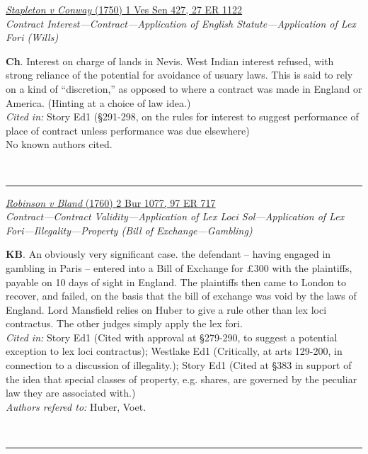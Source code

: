 \documentclass[twoside]{article}
\begin{document}
        \begin{small}
        \begin{center}
        \href{https://heinonline.org/HOL/P?h=hein.engrep/engrc0027&i=1130}{\textit{Stapleton v Conway} (1750) 1 Ves Sen 427, 27 ER 1122} \label{25} \\ 
\textit{Contract Interest---Contract---Application of English Statute---Application of Lex Fori (Wills)}\\
        \end{center}
        \textbf{Ch}. Interest on charge of lands in Nevis. West Indian interest refused, with strong reliance of the potential for avoidance of usuary laws.  This is said to rely on a kind of “discretion,” as opposed to where a contract was made in England or America. (Hinting at a choice of law idea.)\\\textit{Cited in: }Story Ed1 (§291-298, on the rules for interest to suggest performance of place of contract unless performance was due elsewhere)\\No known authors cited.
        \end{small}\\
        \rule{\textwidth}{0.5pt}
        

        \begin{small}
        \begin{center}
        \href{https://heinonline.org/HOL/P?h=hein.engrep/engrf0097&i=721}{\textit{Robinson v Bland} (1760) 2 Bur 1077, 97 ER 717} \label{50} \\ 
\textit{Contract---Contract Validity---Application of Lex Loci Sol---Application of Lex Fori---Illegality---Property (Bill of Exchange---Gambling)}\\
        \end{center}
        \textbf{KB}. An obviously very significant case. the defendant -- having engaged in gambling in Paris -- entered into a Bill of Exchange for £300 with the plaintiffs, payable on 10 days of sight in England. The plaintiffs then came to London to recover, and failed, on the basis that the bill of exchange was void by the laws of England. Lord Mansfield relies on Huber to give a rule other than lex loci contractus. The other judges simply apply the lex fori.\\\textit{Cited in: }Story Ed1 (Cited with approval at §279-290, to suggest a potential exception to lex loci contractus); Westlake Ed1 (Critically, at arts 129-200, in connection to a discussion of illegality.); Story Ed1 (Cited at §383 in support of the idea that special classes of property, e.g. shares, are governed by the peculiar law they are associated with.)\\\textit{Authors refered to: }Huber, Voet.
        \end{small}\\
        \rule{\textwidth}{0.5pt}
        
\end{document}
